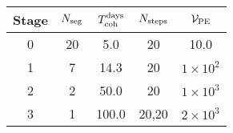 \begin{tabular}{c|cccc}
Stage & $N_{\rm seg}$ & $T_{\rm coh}^{\rm days}$ &$N_{\rm steps}$ & $\mathcal{V}_{\rm PE}$ \\ \hline
0 & 20 & 5.0 & 20 & 10.0 \\
1 & 7 & 14.3 & 20 & $1{\times}10^{2}$ \\
2 & 2 & 50.0 & 20 & $1{\times}10^{3}$ \\
3 & 1 & 100.0 & 20,20 & $2{\times}10^{3}$ \\
\end{tabular}
